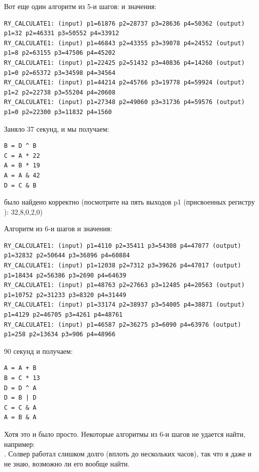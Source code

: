 Вот еще один алгоритм из 5-и шагов:  и значения:

\begin{lstlisting}
RY_CALCULATE1: (input) p1=61876 p2=28737 p3=28636 p4=50362 (output) p1=32 p2=46331 p3=50552 p4=33912
RY_CALCULATE1: (input) p1=46843 p2=43355 p3=39078 p4=24552 (output) p1=8 p2=63155 p3=47506 p4=45202
RY_CALCULATE1: (input) p1=22425 p2=51432 p3=40836 p4=14260 (output) p1=0 p2=65372 p3=34598 p4=34564
RY_CALCULATE1: (input) p1=44214 p2=45766 p3=19778 p4=59924 (output) p1=2 p2=22738 p3=55204 p4=20608
RY_CALCULATE1: (input) p1=27348 p2=49060 p3=31736 p4=59576 (output) p1=0 p2=22300 p3=11832 p4=1560
\end{lstlisting}

Заняло 37 секунд, и мы получаем:

\begin{lstlisting}
B = D ^ B
C = A * 22
A = B * 19
A = A & 42
D = C & B
\end{lstlisting}

 было найдено корректно (посмотрите на пять выходов p1 (присвоенных регистру ): 32,8,0,2,0)

Алгоритм из 6-и шагов  и значения:

\begin{lstlisting}
RY_CALCULATE1: (input) p1=4110 p2=35411 p3=54308 p4=47077 (output) p1=32832 p2=50644 p3=36896 p4=60884
RY_CALCULATE1: (input) p1=12038 p2=7312 p3=39626 p4=47017 (output) p1=18434 p2=56386 p3=2690 p4=64639
RY_CALCULATE1: (input) p1=48763 p2=27663 p3=12485 p4=20563 (output) p1=10752 p2=31233 p3=8320 p4=31449
RY_CALCULATE1: (input) p1=33174 p2=38937 p3=54005 p4=38871 (output) p1=4129 p2=46705 p3=4261 p4=48761
RY_CALCULATE1: (input) p1=46587 p2=36275 p3=6090 p4=63976 (output) p1=258 p2=13634 p3=906 p4=48966
\end{lstlisting}

90 секунд и получаем:

\begin{lstlisting}
A = A + B
B = C * 13
D = D ^ A
D = B | D
C = C & A
A = B & A
\end{lstlisting}

Хотя это и было просто.
Некоторые алгоритмы из 6-и шагов не удается найти, например:\\
.
Солвер работал слишком долго (вплоть до нескольких часов), так что я даже и не знаю, возможно ли его вообще найти.

